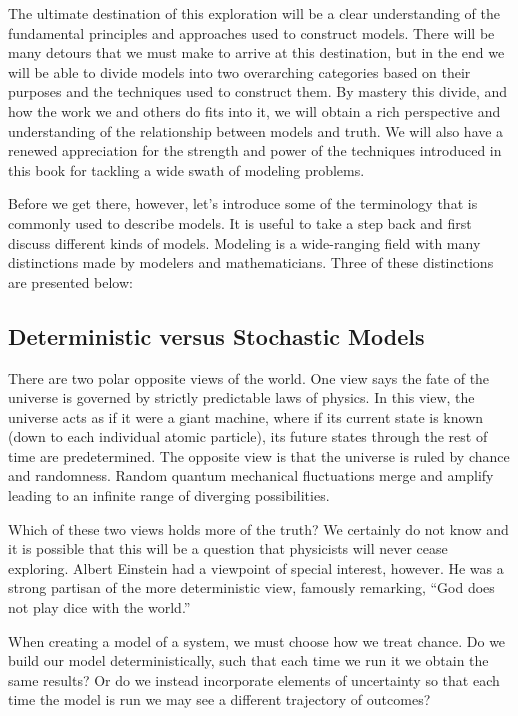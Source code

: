 \documentclass[]{memoir}
\begin{document}
The ultimate destination of this exploration will be a clear
understanding of the fundamental principles and approaches used to
construct models. There will be many detours that we must make to arrive
at this destination, but in the end we will be able to divide models
into two overarching categories based on their purposes and the
techniques used to construct them. By mastery this divide, and how the
work we and others do fits into it, we will obtain a rich perspective
and understanding of the relationship between models and truth. We will
also have a renewed appreciation for the strength and power of the
techniques introduced in this book for tackling a wide swath of modeling
problems.

Before we get there, however, let's introduce some of the terminology
that is commonly used to describe models. It is useful to take a step
back and first discuss different kinds of models. Modeling is a
wide-ranging field with many distinctions made by modelers and
mathematicians. Three of these distinctions are presented below:

\subsection{Deterministic versus Stochastic Models}

There are two polar opposite views of the world. One view says the fate
of the universe is governed by strictly predictable laws of physics. In
this view, the universe acts as if it were a giant machine, where if its
current state is known (down to each individual atomic particle), its
future states through the rest of time are predetermined. The opposite
view is that the universe is ruled by chance and randomness. Random
quantum mechanical fluctuations merge and amplify leading to an infinite
range of diverging possibilities.

Which of these two views holds more of the truth? We certainly do not
know and it is possible that this will be a question that physicists
will never cease exploring. Albert Einstein had a viewpoint of special
interest, however. He was a strong partisan of the more deterministic
view, famously remarking, ``God does not play dice with the world.''

When creating a model of a system, we must choose how we treat chance.
Do we build our model deterministically, such that each time we run it
we obtain the same results? Or do we instead incorporate elements of
uncertainty so that each time the model is run we may see a different
trajectory of outcomes?
\end{document}
